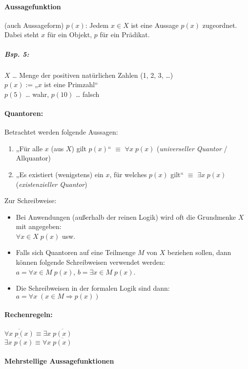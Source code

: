 \paragraph{Aussagefunktion} (auch Aussageform) $p(x)$:
Jedem $x\in X$ ist eine Aussage $p(x)$ zugeordnet. Dabei steht $x$ für ein Objekt, $p$ für ein Prädikat.
\subparagraph{Bsp. 5:}\parskp
$X$ … Menge der positiven natürlichen Zahlen (1, 2, 3, …)\\
$p(x):=$„$x$ ist eine Primzahl“\\
$p(5)$ … wahr, $p(10)$ … falsch

\paragraph{Quantoren:} \parskp
Betrachtet werden folgende Aussagen:
\begin{enumerate}
\item „Für alle $x$ (aus $X$) gilt $p(x)$“ $\equiv$ $\boxed{\forall x\; p(x)}$ (\emph{universeller Quantor} / Allquantor)
\item „Es existiert (wenigstens) ein $x$, für welches $p(x)$ gilt“ $\equiv$ $\boxed{\exists x \; p(x)}$ (\emph{existenzieller Quantor})
\end{enumerate}
Zur Schreibweise: 
\begin{itemize}
\item Bei Anwendungen (außerhalb der reinen Logik) wird oft die Grundmenke $X$ mit angegeben: \\
$\forall x \in X\; p(x)$ usw.
\item Falls sich Quantoren auf eine Teilmenge $M$ von $X$ beziehen sollen, dann können folgende Schreibweisen verwendet werden:\\
$a = \forall x \in M \; p(x)$, $b=\exists x\in M \; p(x)$.
\item Die Schreibweisen in der formalen Logik sind dann:\\
$a = \forall x \;(x \in M \Rightarrow p(x))$
\end{itemize}

\paragraph{Rechenregeln:}\parskp
$\boxed{\overline{\forall x \; p(x)} \equiv \exists x \; \overline{p(x)}}$\\
$\boxed{\overline{\exists x \; p(x)} \equiv \forall x \; \overline{p(x)}}$

\paragraph{Mehrstellige Aussagefunktionen}

